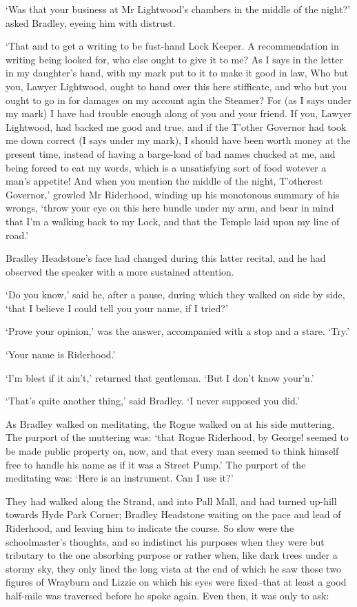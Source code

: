 ‘Was that your business at Mr Lightwood’s chambers in the middle of the
night?’ asked Bradley, eyeing him with distrust.

‘That and to get a writing to be fust-hand Lock Keeper. A recommendation
in writing being looked for, who else ought to give it to me? As I says
in the letter in my daughter’s hand, with my mark put to it to make it
good in law, Who but you, Lawyer Lightwood, ought to hand over this here
stifficate, and who but you ought to go in for damages on my account
agin the Steamer? For (as I says under my mark) I have had trouble
enough along of you and your friend. If you, Lawyer Lightwood, had
backed me good and true, and if the T’other Governor had took me down
correct (I says under my mark), I should have been worth money at the
present time, instead of having a barge-load of bad names chucked at me,
and being forced to eat my words, which is a unsatisfying sort of food
wotever a man’s appetite! And when you mention the middle of the night,
T’otherest Governor,’ growled Mr Riderhood, winding up his monotonous
summary of his wrongs, ‘throw your eye on this here bundle under my arm,
and bear in mind that I’m a walking back to my Lock, and that the Temple
laid upon my line of road.’

Bradley Headstone’s face had changed during this latter recital, and he
had observed the speaker with a more sustained attention.

‘Do you know,’ said he, after a pause, during which they walked on side
by side, ‘that I believe I could tell you your name, if I tried?’

‘Prove your opinion,’ was the answer, accompanied with a stop and a
stare. ‘Try.’

‘Your name is Riderhood.’

‘I’m blest if it ain’t,’ returned that gentleman. ‘But I don’t know
your’n.’

‘That’s quite another thing,’ said Bradley. ‘I never supposed you did.’

As Bradley walked on meditating, the Rogue walked on at his side
muttering. The purport of the muttering was: ‘that Rogue Riderhood, by
George! seemed to be made public property on, now, and that every man
seemed to think himself free to handle his name as if it was a Street
Pump.’ The purport of the meditating was: ‘Here is an instrument. Can I
use it?’

They had walked along the Strand, and into Pall Mall, and had turned
up-hill towards Hyde Park Corner; Bradley Headstone waiting on the pace
and lead of Riderhood, and leaving him to indicate the course. So slow
were the schoolmaster’s thoughts, and so indistinct his purposes when
they were but tributary to the one absorbing purpose or rather when,
like dark trees under a stormy sky, they only lined the long vista at
the end of which he saw those two figures of Wrayburn and Lizzie on
which his eyes were fixed--that at least a good half-mile was traversed
before he spoke again. Even then, it was only to ask:

